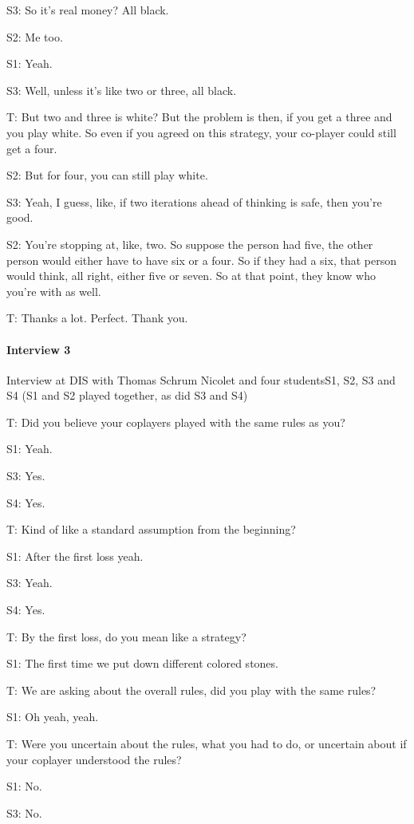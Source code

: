 \documentclass[a4paper,superscriptaddress,nofootinbib]{revtex4}
\begin{document}
S3: So it's real money? All black. 

S2: Me too.

S1: Yeah. 

S3: Well, unless it's like two or three, all black.

T: But two and three is white? But the problem is then, if you get a three and you play white. So even if you agreed on this strategy, your co-player could still get a four.

S2: But for four, you can still play white.

S3: Yeah, I guess, like, if two iterations ahead of thinking is safe, then you're good. 

S2: You're stopping at, like, two. So suppose the person had five, the other person would either have to have six or a four. So if they had a six, that person would think, all right, either five or seven. So at that point, they know who you're with as well. 

T: Thanks a lot. Perfect. Thank you.


\bigskip
\paragraph{Interview 3}
Interview at DIS with Thomas Schrum Nicolet and four studentsS1, S2, S3 and S4 (S1 and S2 played together, as did S3 and S4)

\medskip
T: Did you believe your coplayers played with the same rules as you?

S1: Yeah.

S3: Yes.

S4: Yes.

T: Kind of like a standard assumption from the beginning?

S1: After the first loss yeah.

S3: Yeah.

S4: Yes.

T: By the first loss, do you mean like a strategy?

S1: The first time we put down different colored stones.

T: We are asking about the overall rules, did you play with the same rules?

S1: Oh yeah, yeah.

T: Were you uncertain about the rules, what you had to do, or uncertain about if your coplayer understood the rules?

S1: No.

S3: No.
\end{document}
